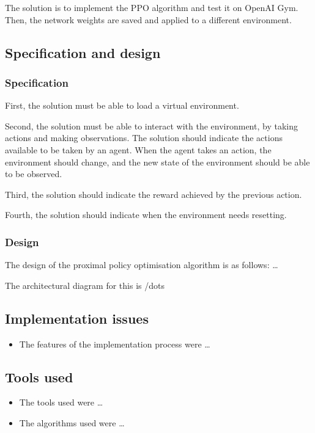 \documentclass[12pt,a4paper]{article}
\begin{document}
The solution is to implement the PPO algorithm and test it on OpenAI Gym. Then, the network weights are saved and applied to a different environment. 

\subsection{Specification and design}
\subsubsection{Specification}
First, the solution must be able to load a virtual environment. 

Second, the solution must be able to interact with the environment, by taking actions and making observations. The solution should indicate the actions available to be taken by an agent. When the agent takes an action, the environment should change, and the new state of the environment should be able to be observed.  

Third, the solution should indicate the reward achieved by the previous action.

Fourth, the solution should indicate when the environment needs resetting. 

\subsubsection{Design}
The design of the proximal policy optimisation algorithm is as follows: \dots 

The architectural diagram for this is /dots

\subsection{Implementation issues}
\begin{itemize}
    \item The features of the implementation process were \dots
\end{itemize}

\subsection{Tools used}
\begin{itemize}
    \item The tools used were \dots
    \item The algorithms used were \dots
\end{itemize}
\end{document}
